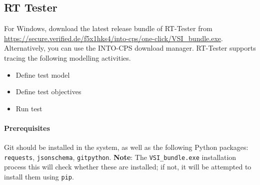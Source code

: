 \subsection{RT Tester}
For Windows, download the latest release bundle of RT-Tester from\\
\url{https://secure.verified.de/f5x1hks4/into-cps/one-click/VSI_bundle.exe}.  Alternatively, you can use the INTO-CPS download manager.  RT-Tester supports tracing the following modelling activities.
%
\begin{itemize}
\item    Define test model
\item    Define test objectives
\item    Run test
\end{itemize}
%
\paragraph{Prerequisites}
Git should be installed in the system, as well as the following Python packages: {\tt requests}, {\tt jsonschema}, {\tt gitpython}.  {\bf Note}: The {\tt VSI\_bundle.exe} installation process this will check whether these are installed; if not, it will be attempted to install them using \texttt{pip}.
%
